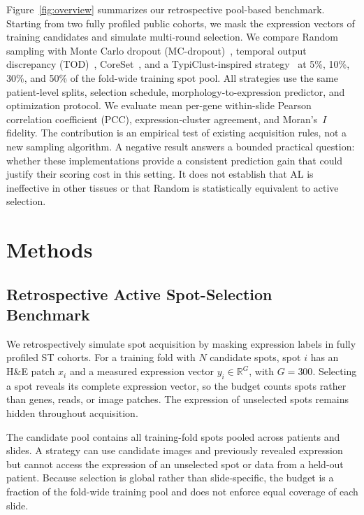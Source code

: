 \documentclass[]{spie}
\begin{document}
Figure~\ref{fig:overview} summarizes our retrospective pool-based benchmark. Starting from two fully profiled public cohorts, we mask the expression vectors of training candidates and simulate multi-round selection. We compare Random sampling with Monte Carlo dropout (MC-dropout)~\cite{gal2016dropout,gal2017deep}, temporal output discrepancy (TOD)~\cite{huang2021semi}, CoreSet~\cite{sener2018active}, and a TypiClust-inspired strategy~\cite{hacohen2022active} at 5\%, 10\%, 30\%, and 50\% of the fold-wide training spot pool. All strategies use the same patient-level splits, selection schedule, morphology-to-expression predictor, and optimization protocol. We evaluate mean per-gene within-slide Pearson correlation coefficient (PCC), expression-cluster agreement, and Moran's~$I$ fidelity. The contribution is an empirical test of existing acquisition rules, not a new sampling algorithm. A negative result answers a bounded practical question: whether these implementations provide a consistent prediction gain that could justify their scoring cost in this setting. It does not establish that AL is ineffective in other tissues or that Random is statistically equivalent to active selection.

\section{Methods}
\label{sec:method}

\subsection{Retrospective Active Spot-Selection Benchmark}
\label{sec:benchmark}

We retrospectively simulate spot acquisition by masking expression labels in fully profiled ST cohorts. For a training fold with $N$ candidate spots, spot $i$ has an H\&E patch $x_i$ and a measured expression vector $y_i\in\mathbb{R}^{G}$, with $G=300$. Selecting a spot reveals its complete expression vector, so the budget counts spots rather than genes, reads, or image patches. The expression of unselected spots remains hidden throughout acquisition.

The candidate pool contains all training-fold spots pooled across patients and slides. A strategy can use candidate images and previously revealed expression but cannot access the expression of an unselected spot or data from a held-out patient. Because selection is global rather than slide-specific, the budget is a fraction of the fold-wide training pool and does not enforce equal coverage of each slide.
\end{document}
